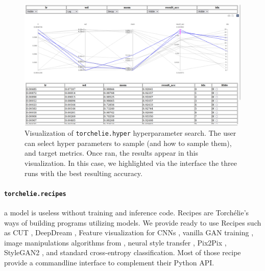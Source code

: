 \begin{figure}
    \centering
    \includegraphics[width=\columnwidth]{90-files/hyper.png}
    \caption{Visualization of \texttt{torchelie.hyper} hyperparameter search. The user can select hyper parameters to sample (and how to sample them), and target metrics. Once ran, the results appear in this visualization. In this case, we highlighted via the interface the three runs with the best resulting accuracy.}
    \label{fig:tch.hyper}
\end{figure}

\paragraph{\texttt{torchelie.recipes}} a model is useless without training and inference code. Recipes are Torchélie's ways of building programs utilizing models. We provide ready to use Recipes such as CUT \cite{cut}, DeepDream \cite{deepdream}, Feature visualization for \acp{CNN} \cite{featureviz}, vanilla \ac{GAN} training \cite{gan}, image manipulations algorithms from \citet{deepimageprior}, neural style transfer \cite{styletransfer}, Pix2Pix \cite{pix2pix}, StyleGAN2 \cite{stylegan2}, and standard cross-entropy classification. Most of those recipe provide a commandline interface to complement their Python API.


